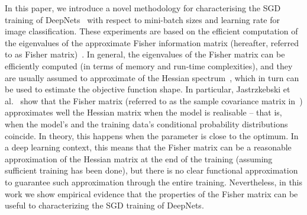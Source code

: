 \documentclass[10pt,journal,compsoc]{IEEEtran}
\begin{document}
In this paper, we introduce a novel methodology for characterising the SGD training of DeepNets~\cite{he2016deep, huang2016densely} with respect to mini-batch sizes and learning rate for image classification.  
These experiments are based on the efficient computation of the  eigenvalues of the approximate Fisher information matrix (hereafter, referred to as Fisher matrix)~\cite{chaudhari2016entropy,martens2014new}.  
In general, the eigenvalues of the Fisher matrix can be efficiently computed (in terms of memory and run-time complexities), and they are usually assumed to approximate of the Hessian spectrum~\cite{chaudhari2016entropy,martens2014new, sagun2017empirical, jastrzkebski2017three}, which in turn can be used to estimate the objective function shape.
In particular, Jastrzkebski et al.~\cite{jastrzkebski2017three} show that the Fisher matrix (referred to as the sample covariance matrix in~\cite{jastrzkebski2017three}) approximates well the Hessian matrix when the model is realisable -- that is, when the model's and the training data's conditional probability distributions coincide.  In theory, this happens when the parameter is close to the optimum.
In a deep learning context, this means that the Fisher matrix can be a reasonable approximation of the Hessian matrix at the end of the training (assuming sufficient training has been done), but there is no clear functional approximation to guarantee such approximation through the entire training. 
Nevertheless, in this work we show empirical evidence that the properties of the Fisher matrix can be useful to characterizing the SGD training of DeepNets.%
\end{document}
